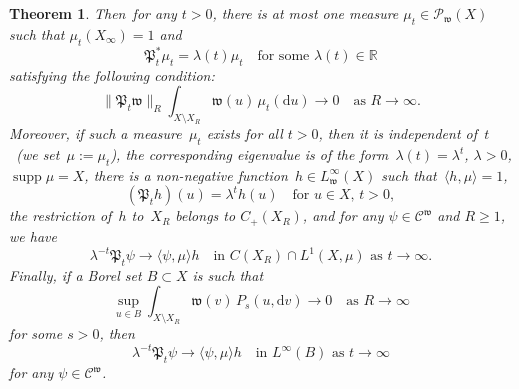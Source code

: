 \documentclass[10pt]{amsart}
\newtheorem{theo}{Theorem}[section]
\theoremstyle{definition}\newtheorem{defi}[theo]{Definition}\newtheorem{rema}[theo]{Remark}\newtheorem{exam}[theo]{Example}\newtheorem{exem}[theo]{Example}\newtheorem{nota}[theo]{Notation}
\DeclareMathOperator{\supp}{supp}
\newcommand{\R}{{\mathbb R}}
\newcommand{\CC}{{\mathcal C}}
\newcommand{\la}{\lambda}
\newcommand{\ty}{\infty}
\newcommand{\wwww}{{\mathfrak w}}
\newcommand{\PPPP}{{\mathfrak P}}
\newcommand{\lag}{\langle}
\newcommand{\rag}{\rangle}
\newcommand{\dd}{\mathrm{d}}
\begin{document}
\begin{theo}
Then~for any $t>0$, there is at most one measure $\mu_t\in{\mathcal P}_\wwww(X)$ such that $\mu_t(X_\ty)=1$ and
\[
\PPPP^*_t \mu_t=\la(t)\mu_t \quad \text{for some $\la(t)\in \R$}
\]
satisfying the following condition:
\[
\|\PPPP_t\wwww\|_R\int_{X\setminus X_R}\wwww(u)\, \mu_t(\dd u)\to0
\quad\mbox{as $R\to\infty$}.
\]
Moreover, if such a measure~$\mu_t$ exists for all $t>0$, then it is independent of~$t$~(we set~$\mu:=\mu_t$), the corresponding eigenvalue is of the form~$\lambda(t)=\la^t$, $\la>0$, $\supp \mu=X$, there is a non-negative function~$h\in L^\ty_\wwww(X)$ such that~$\lag h,\mu\rag=1$,
\[
(\PPPP_t h)(u)=\lambda^t h(u)\quad\mbox{for $u\in X$, $t>0$},
\]
the restriction of~$h$ to~$X_R$ belongs to $C_+(X_R)$,
and for any $\psi\in \CC^\wwww$ and $R\ge1$, we have
\begin{equation}
\lambda^{-t}\PPPP_t \psi\to\lag \psi,\mu\rag h
\quad\text{in~$C(X_R)\cap L^1(X,\mu)$ as~$t\to\infty$}. \label{5.12}
\end{equation}
Finally, if a Borel set $B\subset X$ is such that
\begin{equation}
\sup_{u\in B} \int_{X\setminus X_R}\wwww(v)\,P_s(u,\dd v) \to0
\quad\text{as $R\to\infty$} \label{5.13}
\end{equation}
for some $s>0$,
then
\[
\lambda^{-t}\PPPP_t \psi\to\lag \psi,\mu\rag h
\quad\text{in~$L^\ty(B)$ as~$t\to\infty$}
\]
for any $\psi\in \CC^\wwww$.
\end{theo}
\end{document}
